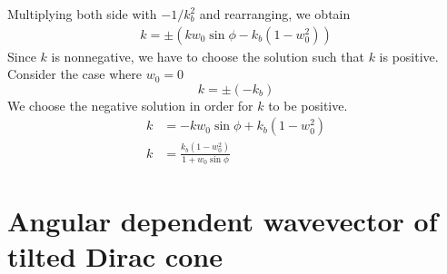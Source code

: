     Multiplying both side with $-1/k_b^2$ and rearranging, we obtain
    \begin{align} 
        k = \pm (k w_0 \sin{\phi} - k_b(1-w_0^2))
    \end{align}
    Since $k$ is nonnegative, we have to choose the solution such that $k$ is positive.
    Consider the case where $w_0 = 0$
    $$
    k = \pm (-k_b)
    $$
    We choose the negative solution in order for $k$ to be positive.
    \begin{equation}
    \begin{aligned} \label{eq:k vs phi}
        k &= -k w_0 \sin{\phi}+ k_b (1-w_0^2)\\
        k &= \frac{k_b(1-w_0^2)}{1+w_0 \sin{\phi}}
    \end{aligned}
    \end{equation}

\section{Angular dependent wavevector of tilted Dirac cone} \label{sec:k angular dependent k}
     
